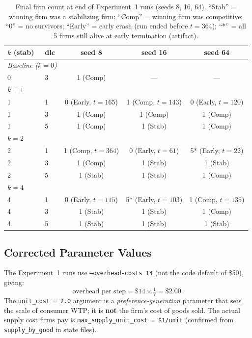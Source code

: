 \documentclass{article}
\begin{document}
\begin{table}[h!]
\centering
\small
\caption{Final firm count at end of Experiment~1 runs (seeds 8, 16, 64). ``Stab'' = winning firm was a stabilizing firm; ``Comp'' = winning firm was competitive; ``0'' = no survivors; ``Early'' = early crash (run ended before \(t=364\)); ``*'' = all 5 firms still alive at early termination (artifact).}
\label{tab:exp1_survival}
\begin{tabular}{llccc}
\toprule
$k$ (stab) & dlc & seed 8 & seed 16 & seed 64 \\
\midrule
\multicolumn{2}{l}{\textit{Baseline (\(k=0\))}} \\
0 & 3 & 1 (Comp) & --- & --- \\
\midrule
\multicolumn{2}{l}{\(k=1\)} \\
1 & 1 & 0 (Early, \(t=165\)) & 1 (Comp, \(t=143\)) & 0 (Early, \(t=120\)) \\
1 & 3 & 1 (Comp) & 1 (Comp) & 1 (Comp) \\
1 & 5 & 1 (Comp) & 1 (Stab) & 1 (Comp) \\
\midrule
\multicolumn{2}{l}{\(k=2\)} \\
2 & 1 & 1 (Comp, \(t=364\)) & 0 (Early, \(t=61\)) & 5* (Early, \(t=22\)) \\
2 & 3 & 1 (Comp) & 1 (Stab) & 1 (Stab) \\
2 & 5 & 1 (Stab) & 1 (Stab) & 1 (Comp) \\
\midrule
\multicolumn{2}{l}{\(k=4\)} \\
4 & 1 & 0 (Early, \(t=115\)) & 5* (Early, \(t=103\)) & 1 (Comp, \(t=135\)) \\
4 & 3 & 1 (Stab) & 1 (Stab) & 1 (Comp) \\
4 & 5 & 1 (Stab) & 1 (Stab) & 1 (Stab) \\
\bottomrule
\end{tabular}
\end{table}

\subsection{Corrected Parameter Values}

The Experiment~1 runs use \texttt{--overhead-costs 14} (not the code default of \$50), giving:
\[
  \text{overhead per step} = \$14 \times \tfrac{1}{7} = \$2.00.
\]
The \texttt{unit\_cost = 2.0} argument is a \emph{preference-generation} parameter that sets the scale of consumer WTP; it is \textbf{not} the firm's cost of goods sold. The actual supply cost firms pay is \texttt{max\_supply\_unit\_cost = \$1/unit} (confirmed from \texttt{supply\_by\_good} in state files).
\end{document}
